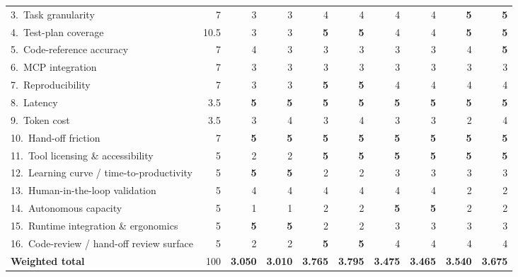 \begin{table}[h]
\begin{tabular}{lr rr rr rr rr}
3.\ Task granularity                     & 7    & 3 & 3 & 4          & 4          & 4 & 4 & \textbf{5} & \textbf{5} \\
4.\ Test-plan coverage                   & 10.5 & 3 & 3 & \textbf{5} & \textbf{5} & 4 & 4 & \textbf{5} & \textbf{5} \\
5.\ Code-reference accuracy              & 7    & 4 & 3 & 3          & 3          & 3 & 3 & 4 & \textbf{5} \\
6.\ MCP integration                      & 7    & 3 & 3 & 3          & 3          & 3 & 3 & 3 & 3 \\
7.\ Reproducibility                      & 7    & 3 & 3 & \textbf{5} & \textbf{5} & 4 & 4 & 4 & 4 \\
8.\ Latency                              & 3.5  & \textbf{5} & \textbf{5} & \textbf{5} & \textbf{5} & \textbf{5} & \textbf{5} & \textbf{5} & \textbf{5} \\
9.\ Token cost                           & 3.5  & 3 & 4 & 3 & 4 & 3 & 3 & 2 & 4 \\
10.\ Hand-off friction                   & 7    & \textbf{5} & \textbf{5} & \textbf{5} & \textbf{5} & \textbf{5} & \textbf{5} & \textbf{5} & \textbf{5} \\
\midrule
11.\ Tool licensing \& accessibility     & 5    & 2          & 2          & \textbf{5} & \textbf{5} & \textbf{5} & \textbf{5} & \textbf{5} & \textbf{5} \\
12.\ Learning curve / time-to-productivity & 5  & \textbf{5} & \textbf{5} & 2          & 2          & 3          & 3 & 3 & 3 \\
13.\ Human-in-the-loop validation        & 5    & 4          & 4          & 4          & 4          & 4          & 4 & 2 & 2 \\
14.\ Autonomous capacity                 & 5    & 1          & 1          & 2          & 2          & \textbf{5} & \textbf{5} & 2 & 2 \\
15.\ Runtime integration \& ergonomics   & 5    & \textbf{5} & \textbf{5} & 2          & 2          & 3          & 3 & 3 & 3 \\
16.\ Code-review / hand-off review surface & 5  & 2          & 2          & \textbf{5} & \textbf{5} & 4          & 4 & 4 & 4 \\
\midrule
\textbf{Weighted total}                  & 100  & \textbf{3.050} & \textbf{3.010} & \textbf{3.765} & \textbf{3.795} & \textbf{3.475} & \textbf{3.465} & \textbf{3.540} & \textbf{3.675} \\
\bottomrule
\end{tabular}
\end{table}

